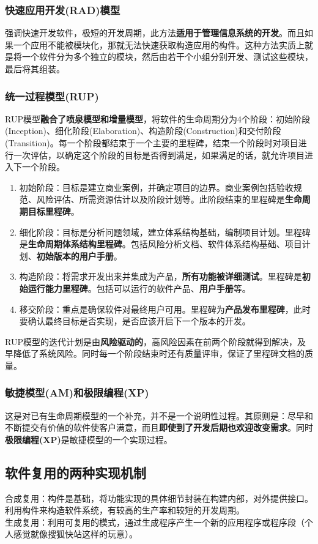 \documentclass[chapter.computer_science.tex]{subfiles}
\begin{document}
\subsubsection{快速应用开发(RAD)模型}
强调快速开发软件，极短的开发周期，此方法{\bfseries 适用于管理信息系统的开发}。而且如果一个应用不能被模块化，那就无法快速获取构造应用的构件。这种方法实质上就是将一个软件分为多个独立的模块，然后由若干个小组分别开发、测试这些模块，最后将其组装。
\subsubsection{统一过程模型(RUP)}
RUP模型{\bfseries 融合了喷泉模型和增量模型}，将软件的生命周期分为4个阶段：初始阶段(Inception)、细化阶段(Elaboration)、构造阶段(Construction)和交付阶段(Transition)。每一个阶段都结束于一个主要的里程碑，结束一个阶段时对项目进行一次评估，以确定这个阶段的目标是否得到满足，如果满足的话，就允许项目进入下一个阶段。\\
\begin{enumerate}
    \item 初始阶段：目标是建立商业案例，并确定项目的边界。商业案例包括验收规范、风险评估、所需资源估计以及阶段计划等。此阶段结束的里程碑是{\bfseries 生命周期目标里程碑}。
    \item 细化阶段：目标是分析问题领域，建立体系结构基础，编制项目计划。里程碑是{\bfseries 生命周期体系结构里程碑}。包括风险分析文档、软件体系结构基础、项目计划、{\bfseries 初始版本的用户手册}。
    \item 构造阶段：将需求开发出来并集成为产品，{\bfseries 所有功能被详细测试}。里程碑是{\bfseries 初始运行能力里程碑}。包括可以运行的软件产品、{\bfseries 用户手册}等。
    \item 移交阶段：重点是确保软件对最终用户可用。里程碑为{\bfseries 产品发布里程碑}，此时要确认最终目标是否实现，是否应该开启下一个版本的开发。
\end{enumerate}
RUP模型的迭代计划是由{\bfseries 风险驱动的}，高风险因素在前两个阶段就得到解决，及早降低了系统风险。同时每一个阶段结束时还有质量评审，保证了里程碑文档的质量。
\subsubsection{敏捷模型(AM)和极限编程(XP)}
这是对已有生命周期模型的一个补充，并不是一个说明性过程。其原则是：尽早和不断提交有价值的软件使客户满意，而且{\bfseries 即使到了开发后期也欢迎改变需求}。同时{\bfseries 极限编程(XP)}是敏捷模型的一个实现过程。

\subsection{软件复用的两种实现机制}
合成复用：构件是基础，将功能实现的具体细节封装在构建内部，对外提供接口。利用构件来构造软件系统，有较高的生产率和较短的开发周期。\\
生成复用：利用可复用的模式，通过生成程序产生一个新的应用程序或程序段（个人感觉就像搜狐快站这样的玩意）。
\end{document}
